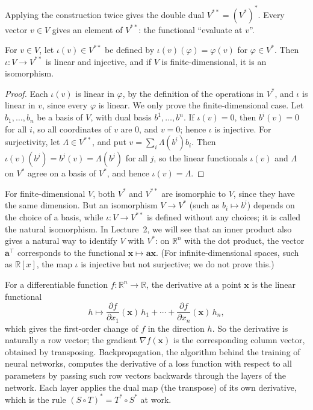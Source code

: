 Applying the construction twice gives the double dual $V^{**} = (V^*)^*$. Every vector $v \in V$ gives an element of $V^{**}$: the functional ``evaluate at $v$''.

\begin{theorem}\label{L1-thm:double-dual}
    For $v \in V$, let $\iota(v) \in V^{**}$ be defined by $\iota(v)(\varphi) = \varphi(v)$ for $\varphi \in V^*$. Then $\iota: V \to V^{**}$ is linear and injective, and if $V$ is finite-dimensional, it is an isomorphism.
\end{theorem}

\begin{proof}
    Each $\iota(v)$ is linear in $\varphi$, by the definition of the operations in $V^*$, and $\iota$ is linear in $v$, since every $\varphi$ is linear. We only prove the finite-dimensional case. Let $b_1, \ldots, b_n$ be a basis of $V$, with dual basis $b^1, \ldots, b^n$. If $\iota(v) = 0$, then $b^i(v) = 0$ for all $i$, so all coordinates of $v$ are $0$, and $v = 0$; hence $\iota$ is injective. For surjectivity, let $\Lambda \in V^{**}$, and put $v = \sum_i \Lambda(b^i) b_i$. Then $\iota(v)(b^j) = b^j(v) = \Lambda(b^j)$ for all $j$, so the linear functionals $\iota(v)$ and $\Lambda$ on $V^*$ agree on a basis of $V^*$, and hence $\iota(v) = \Lambda$.
\end{proof}

\begin{remark}
    For finite-dimensional $V$, both $V^*$ and $V^{**}$ are isomorphic to $V$, since they have the same dimension. But an isomorphism $V \to V^*$ (such as $b_i \mapsto b^i$) depends on the choice of a basis, while $\iota: V \to V^{**}$ is defined without any choices; it is called the natural isomorphism. In Lecture~2, we will see that an inner product also gives a natural way to identify $V$ with $V^*$: on $\mathbb{R}^n$ with the dot product, the vector $\mathbf{a}^\top$ corresponds to the functional $\mathbf{x} \mapsto \mathbf{a}\mathbf{x}$. (For infinite-dimensional spaces, such as $\mathbb{R}[x]$, the map $\iota$ is injective but not surjective; we do not prove this.)
\end{remark}

\begin{remark}
    For a differentiable function $f: \mathbb{R}^n \to \mathbb{R}$, the derivative at a point $\mathbf{x}$ is the linear functional
    \[h \mapsto \frac{\partial f}{\partial x_1}(\mathbf{x})\, h_1 + \cdots + \frac{\partial f}{\partial x_n}(\mathbf{x})\, h_n,\]
    which gives the first-order change of $f$ in the direction $h$. So the derivative is naturally a row vector; the gradient $\nabla f(\mathbf{x})$ is the corresponding column vector, obtained by transposing. Backpropagation, the algorithm behind the training of neural networks, computes the derivative of a loss function with respect to all parameters by passing such row vectors backwards through the layers of the network. Each layer applies the dual map (the transpose) of its own derivative, which is the rule $(S \circ T)^* = T^* \circ S^*$ at work.
\end{remark}

